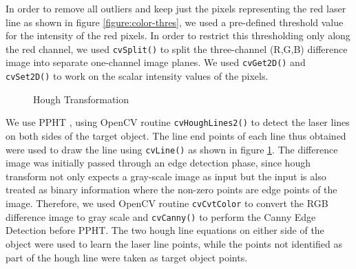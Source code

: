 In order to remove all outliers and keep just the pixels
representing the red laser line as shown in figure \ref{figure:color-thres},
we used a pre-defined threshold value for the intensity of the red pixels. In
order to restrict this thresholding only along the red channel, we used
\texttt{cvSplit()} to split the three-channel (R,G,B) difference image into
separate one-channel image planes. We used \texttt{cvGet2D()} and
\texttt{cvSet2D()} to work on the scalar intensity values of the pixels.

\begin{figure}[ht!]
\centering
{} \quad
{} \hfill
\caption{Hough Transformation}
\label{figure:hough-transform}
\end{figure}

We use \ac{PPHT} \cite{kiryati:1991}, \cite{matas:2000} using OpenCV routine
\texttt{cvHoughLines2()} to detect the laser lines on both sides of the target
object. The line end points of each line thus obtained were used to draw the
line using \texttt{cvLine()} as shown in figure \ref{figure:hough-transform}.
The difference image was initially passed through an edge detection phase,
since hough transform not only expects a gray-scale image as input but the
input is also treated as binary information where the non-zero points are edge
points of the image. Therefore, we used OpenCV routine \texttt{cvCvtColor} to
convert the RGB difference image to gray scale and \texttt{cvCanny()} to
perform the Canny Edge Detection \cite{canny:1986} before \ac{PPHT}. The two
hough line equations on either side of the object were used to learn the laser
line points, while the points not identified as part of the hough line were
taken as target object points.
